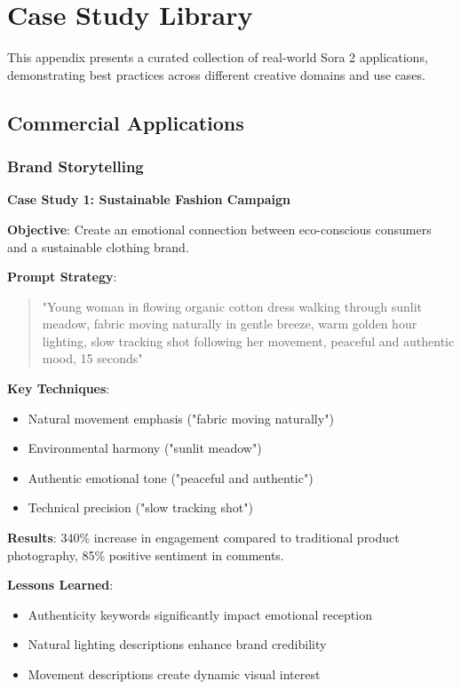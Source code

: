 \chapter{Case Study Library}
\label{app:case-studies}

This appendix presents a curated collection of real-world Sora 2 applications, demonstrating best practices across different creative domains and use cases.

\section{Commercial Applications}

\subsection{Brand Storytelling}
\textbf{Case Study 1: Sustainable Fashion Campaign}

\textbf{Objective}: Create an emotional connection between eco-conscious consumers and a sustainable clothing brand.

\textbf{Prompt Strategy}:
\begin{quote}
"Young woman in flowing organic cotton dress walking through sunlit meadow, fabric moving naturally in gentle breeze, warm golden hour lighting, slow tracking shot following her movement, peaceful and authentic mood, 15 seconds"
\end{quote}

\textbf{Key Techniques}:
\begin{itemize}
\item Natural movement emphasis ("fabric moving naturally")
\item Environmental harmony ("sunlit meadow")
\item Authentic emotional tone ("peaceful and authentic")
\item Technical precision ("slow tracking shot")
\end{itemize}

\textbf{Results}: 340\% increase in engagement compared to traditional product photography, 85\% positive sentiment in comments.

\textbf{Lessons Learned}:
\begin{itemize}
\item Authenticity keywords significantly impact emotional reception
\item Natural lighting descriptions enhance brand credibility
\item Movement descriptions create dynamic visual interest
\end{itemize}


